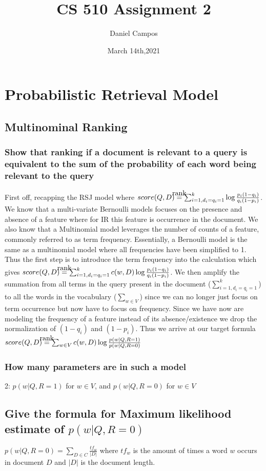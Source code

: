 \documentclass[11pt]{article}
\title{CS 510 Assignment 2}
\author{Daniel Campos}
\date{March 14th,2021}
\newcommand\myeq{\stackrel{\mathclap{\normalfont\mbox{rank}}}{=}}
\begin{document}
\maketitle
\section{Probabilistic Retrieval Model}
\subsection{Multinominal Ranking}
\subsubsection{Show that ranking if a document is relevant to a query is equivalent to the sum of the probability of each word being relevant to the query}
First off, recapping the RSJ model where $score(Q,D) \myeq  \sum_{i=1, d_i=q_i=1}^k \log \frac{p_i(1-q_i)}{q_i(1-p_i)} $. We know that a multi-variate Bernoulli models focuses on the presence and absence of a feature where for IR this feature is occurrence in the document. We also know that a Multinomial model leverages the number of counts of a feature, commonly referred to as term frequency. Essentially, a Bernoulli model is the same as a multinomial model where all frequencies have been simplified to 1. Thus the first step is to introduce the term frequency into the calculation which gives $score(Q,D) \myeq  \sum_{i=1, d_i=q_i=1}^k c(w,D) \log \frac{p_i(1-q_i)}{q_i(1-p_i)} $. We then amplify the summation from all terms in the query present in the document ($\sum_{i=1, d_i=q_i=1}^k$) to all the words in the vocabulary ($\sum_{w \in V}$) since we can no longer just focus on term occurrence but now have to focus on frequency. Since we have now are modeling the frequency of a feature instead of its absence/existence we drop the normalization of $(1-q_i)$ and $(1-p_i)$. Thus we arrive at our target formula $score(Q,D) \myeq  \sum_{w \in V} c(w,D) \log \frac{p(w|Q, R=1)}{p(w|Q, R=0)} $
\subsubsection{How many parameters are in such a model}
2: $p(w|Q, R=1)$ for $w \in V$, and $p(w|Q, R=0)$ for $w \in V$
\subsection{Give the formula for Maximum likelihood estimate of $p(w | Q, R= 0)$}
$p(w | Q, R=0) = \sum_{D \in C} \frac{tf_w}{|D|}$ where $tf_w$ is the amount of times a word $w$ occurs in document $D$ and $|D|$ is the document length.
\end{document}

